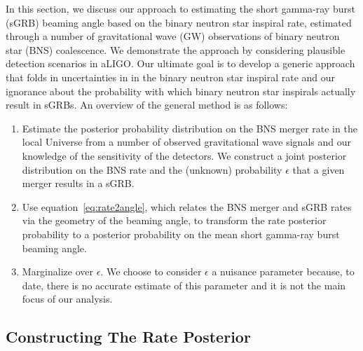 \documentclass[twocolumn,nofootinbib]{revtex4-1}
\def\bns#1{binary neutron star#1 (BNS#1)\gdef\bns{BNS}}
\def\gw#1{gravitational wave#1 (GW#1)\gdef\gw{GW}}
\def\sgrb#1{short gamma-ray burst#1 (sGRB#1)\gdef\sgrb{sGRB}}
\begin{document}
In this section, we discuss our approach to estimating the \sgrb{} beaming
angle based on the binary neutron star inspiral rate, estimated through a number
of \gw{} observations of \bns{} coalescence. We demonstrate the approach by
considering plausible detection scenarios in aLIGO.  Our ultimate goal is to
develop a generic approach that folds in uncertainties in in the binary neutron
star inspiral rate and our ignorance about the probability with which binary
neutron star inspirals actually result in \sgrb{s}.
%
An overview of the general method is as follows:

\begin{enumerate}
    \item Estimate the posterior probability distribution on the \bns{} merger rate
    in the local Universe from a number of observed gravitational wave signals
    and our knowledge of the sensitivity of the detectors.  We construct a joint
    posterior distribution on the \bns{} rate and the (unknown) probability
    $\epsilon$ that a given merger results in a \sgrb{}.
\item Use equation~\ref{eq:rate2angle}, which relates the \bns{} merger and
    \sgrb{} rates via the geometry of the beaming angle, to transform the rate
    posterior probability to a posterior probability on the mean short gamma-ray
    burst beaming angle.
\item Marginalize over $\epsilon$. We choose to consider $\epsilon$ a nuisance
    parameter because, to date, there is no accurate estimate of this parameter
    and it is not the main focus of our analysis. 
\end{enumerate}


\subsection{Constructing The Rate Posterior}
\label{sec:rate_posterior}
%
\end{document}
